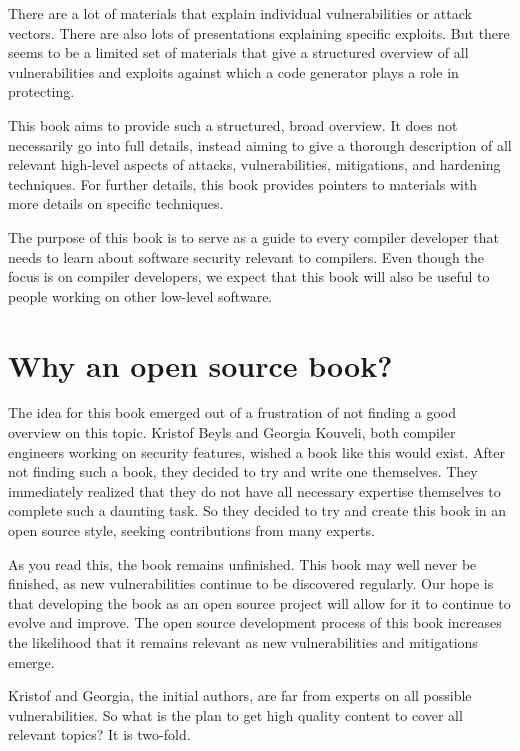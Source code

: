 \documentclass[a4paper,]{report}
\begin{document}
There are a lot of materials that explain individual vulnerabilities or
attack vectors. There are also lots of presentations explaining specific
exploits. But there seems to be a limited set of materials that give a
structured overview of all vulnerabilities and exploits against which a
code generator plays a role in protecting.

This book aims to provide such a structured, broad overview. It does not
necessarily go into full details, instead aiming to give a thorough
description of all relevant high-level aspects of attacks,
vulnerabilities, mitigations, and hardening techniques. For further
details, this book provides pointers to materials with more details on
specific techniques.

The purpose of this book is to serve as a guide to every compiler
developer that needs to learn about software security relevant to
compilers. Even though the focus is on compiler developers, we expect
that this book will also be useful to people working on other low-level
software.

\hypertarget{why-an-open-source-book}{%
\section{Why an open source book?}\label{why-an-open-source-book}}

The idea for this book emerged out of a frustration of not finding a
good overview on this topic. Kristof Beyls and Georgia Kouveli, both
compiler engineers working on security features, wished a book like this
would exist. After not finding such a book, they decided to try and
write one themselves. They immediately realized that they do not have
all necessary expertise themselves to complete such a daunting task. So
they decided to try and create this book in an open source style,
seeking contributions from many experts.

As you read this, the book remains unfinished. This book may well never
be finished, as new vulnerabilities continue to be discovered regularly.
Our hope is that developing the book as an open source project will
allow for it to continue to evolve and improve. The open source
development process of this book increases the likelihood that it
remains relevant as new vulnerabilities and mitigations emerge.

Kristof and Georgia, the initial authors, are far from experts on all
possible vulnerabilities. So what is the plan to get high quality
content to cover all relevant topics? It is two-fold.
\end{document}
